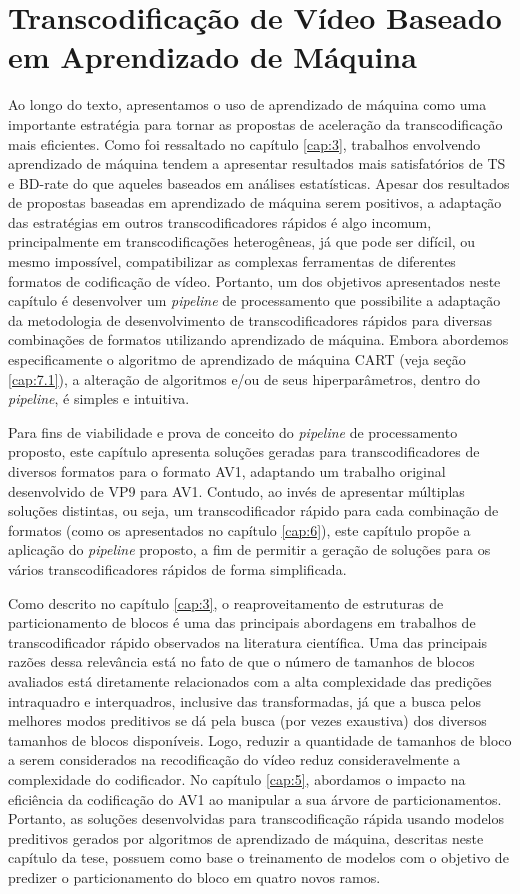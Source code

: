 \chapter{Transcodificação de Vídeo Baseado em Aprendizado de Máquina}
\label{cap:7}

Ao longo do texto, apresentamos o uso de aprendizado de máquina como uma importante estratégia para tornar as propostas de aceleração da transcodificação mais eficientes. Como foi ressaltado no capítulo \ref{cap:3}, trabalhos envolvendo aprendizado de máquina tendem a apresentar resultados mais satisfatórios de TS e BD-rate do que aqueles baseados em análises estatísticas. Apesar dos resultados de propostas baseadas em aprendizado de máquina serem positivos, a adaptação das estratégias em outros transcodificadores rápidos é algo incomum, principalmente em transcodificações heterogêneas, já que pode ser difícil, ou mesmo impossível, compatibilizar as complexas ferramentas de diferentes formatos de codificação de vídeo. Portanto, um dos objetivos apresentados neste capítulo é desenvolver um \textit{pipeline} de processamento que possibilite a adaptação da metodologia de desenvolvimento de transcodificadores rápidos para diversas combinações de formatos utilizando aprendizado de máquina. Embora abordemos especificamente o algoritmo de aprendizado de máquina CART (veja seção \ref{cap:7.1}), a alteração de algoritmos e/ou de seus hiperparâmetros, dentro do \textit{pipeline}, é simples e intuitiva.

Para fins de viabilidade e prova de conceito do \textit{pipeline} de processamento proposto, este capítulo apresenta soluções geradas para transcodificadores de diversos formatos para o formato AV1, adaptando um trabalho original desenvolvido de VP9 para AV1. Contudo, ao invés de apresentar múltiplas soluções distintas, ou seja, um transcodificador rápido para cada combinação de formatos (como os apresentados no capítulo \ref{cap:6}), este capítulo propõe a aplicação do \textit{pipeline} proposto, a fim de permitir a geração de soluções para os vários transcodificadores rápidos de forma simplificada.

Como descrito no capítulo \ref{cap:3}, o reaproveitamento de estruturas de particionamento de blocos é uma das principais abordagens em trabalhos de transcodificador rápido observados na literatura científica. Uma das principais razões dessa relevância está no fato de que o número de tamanhos de blocos avaliados está diretamente relacionados com a alta complexidade das predições intraquadro e interquadros, inclusive das transformadas, já que a busca pelos melhores modos preditivos se dá pela busca (por vezes exaustiva) dos diversos tamanhos de blocos disponíveis. Logo, reduzir a quantidade de tamanhos de bloco a serem considerados na recodificação do vídeo reduz consideravelmente a complexidade do codificador. No capítulo \ref{cap:5}, abordamos o impacto na eficiência da codificação do AV1 ao manipular a sua árvore de particionamentos. Portanto, as soluções desenvolvidas para transcodificação rápida usando modelos preditivos gerados por algoritmos de aprendizado de máquina, descritas neste capítulo da tese, possuem como base o treinamento de modelos com o objetivo de predizer o particionamento do bloco em quatro novos ramos.

